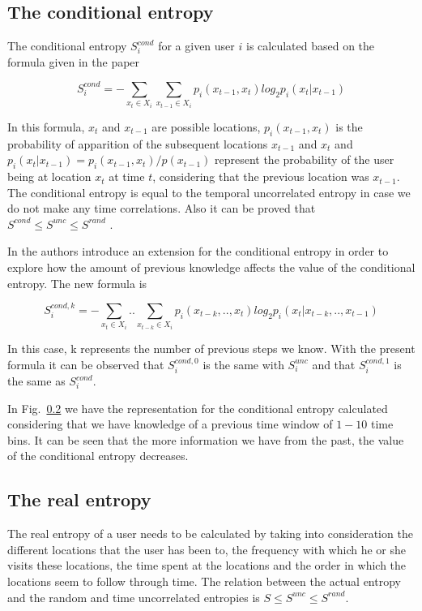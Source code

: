 \subsection{The conditional entropy}
\label{con_e}
The conditional entropy $S_{i}^{cond}$ for a given user $i$ is calculated based
on the formula given in the paper \cite{Sinatra14}

\begin{equation}
S_{i}^{cond} = - \sum\limits_{x_{t}\in X_{i}} \sum\limits_{x_{t-1}\in X_{i}}
p_{i}(x_{t-1},x_{t})log_{2}p_{i}(x_{t}|x_{t-1})
\end{equation}

In this formula, $x_{t}$ and $x_{t-1}$ are possible locations,
$p_{i}(x_{t-1},x_{t})$ is the probability of apparition of the subsequent
locations $x_{t-1}$ and $x_{t}$ and $p_{i}(x_{t}|x_{t-1}) = p_{i}(x_{t-1},x_{t})
/ p(x_{t-1})$ represent the probability of the user being at location $x_{t}$ at
time $t$, considering that the previous location was $x_{t-1}$. The conditional
entropy is equal to the temporal uncorrelated entropy in case we do not make any
time correlations. Also it can be proved that $S^{cond} \leq S^{unc} \leq
S^{rand}$ \cite{Cover:2006:EIT:1146355}.

In \cite{Sinatra14} the authors introduce an extension for the conditional
entropy in order to explore how the amount of previous knowledge affects the
value of the conditional entropy. The new formula is 

\begin{equation}
S_{i}^{cond,k} = - \sum\limits_{x_{t}\in X_{i}} .. \sum\limits_{x_{t-k}\in
X_{i}} p_{i}(x_{t-k},..,x_{t})log_{2}p_{i}(x_{t}|x_{t-k},..,x_{t-1})
\end{equation}

In this case, k represents the number of previous steps we know. With the
present formula it can be observed that $S_{i}^{cond,0}$ is the same with
$S_{i}^{unc}$ and that $S_{i}^{cond,1}$ is the same as $S_{i}^{cond}$.

In Fig.~\ref{} we have the representation for the conditional entropy calculated
considering that we have knowledge of a previous time window of $1 - 10$ time
bins. It can be seen that the more information we have from the past, the
value of the conditional entropy decreases.

\subsection{The real entropy}
The real entropy of a user needs to be calculated by taking into consideration
the different locations that the user has been to, the frequency with which he
or she visits these locations, the time spent at the locations and the order in
which the locations seem to follow through time. The relation between the actual
entropy and the random and time uncorrelated entropies is $S \leq S^{unc}
\leq S^{rand}$. 

